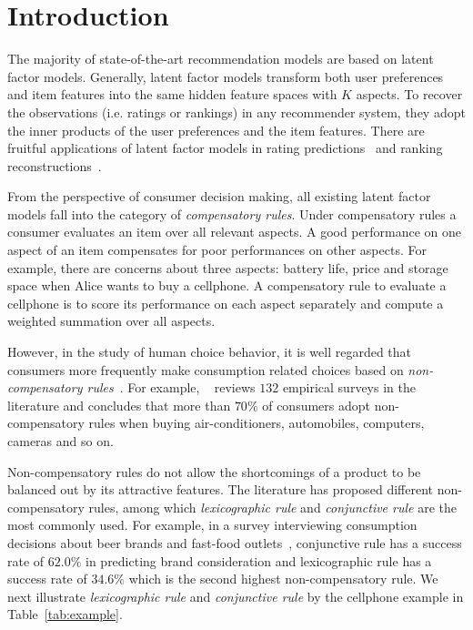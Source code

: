 \documentclass[letterpaper]{article} %
\begin{document}
\section{Introduction}\label{sec:introduction}
The majority of state-of-the-art recommendation models are based on latent factor models. Generally, latent factor models transform both user preferences and item features into the same hidden feature spaces with $K$ aspects. To recover the observations (i.e. ratings or rankings) in any recommender system, they adopt the inner products of the user preferences and the item features. There are fruitful applications of latent factor models in  rating predictions~\cite{Koren2009Matrix,Koren2010Factor,Lee2014Local} and ranking reconstructions~\cite{Rendle2009BPR,Steck2015Gaussian,Zhao2018Factored,Shi2010List}.   

From the perspective of consumer decision making, all existing latent factor models fall into the category of \emph{compensatory rules}. Under compensatory rules a consumer evaluates an item over all relevant aspects. A good performance on one aspect of an item compensates for poor performances on other aspects. For example, there are concerns about three aspects: battery life, price and storage space when Alice wants to buy a cellphone. A compensatory rule to evaluate a cellphone is to score its performance on each aspect separately and compute a weighted summation over all aspects.


However, in the study of human choice behavior, it is well regarded that consumers more frequently make consumption related choices based on \emph{non-compensatory rules}~\cite{Engel1986Consumer}. For example, ~\cite{Hauser2009Non} reviews $132$ empirical surveys in the literature and concludes that more than $70\%$ of consumers adopt non-compensatory rules when buying air-conditioners, automobiles, computers, cameras and so on. 

Non-compensatory rules do not allow the shortcomings of a product to be balanced out by its attractive features. The literature has proposed different non-compensatory rules, among which  \emph{lexicographic rule} and \emph{conjunctive rule} are the most commonly used. For example, in a survey interviewing consumption decisions about beer brands and fast-food outlets~\cite{Laroche2003Which}, conjunctive rule has a success rate of $62.0\%$ in predicting brand consideration and lexicographic rule has a success rate of $34.6\%$ which is the second highest non-compensatory rule. We next illustrate  \emph{lexicographic rule} and \emph{conjunctive rule}  by the cellphone example in Table~\ref{tab:example}. 
\end{document}
